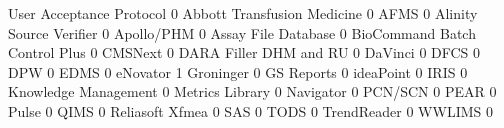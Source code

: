 \documentclass{article}
\begin{document}
\begin{Schunk}
\begin{Soutput}
                                User Acceptance Protocol
                                                       0
  Abbott Transfusion Medicine                          0
  AFMS                                                 0
  Alinity Source Verifier                              0
  Apollo/PHM                                           0
  Assay File Database                                  0
  BioCommand Batch Control Plus                        0
  CMSNext                                              0
  DARA Filler DHM and RU                               0
  DaVinci                                              0
  DFCS                                                 0
  DPW                                                  0
  EDMS                                                 0
  eNovator                                             1
  Groninger                                            0
  GS Reports                                           0
  ideaPoint                                            0
  IRIS                                                 0
  Knowledge Management                                 0
  Metrics Library                                      0
  Navigator                                            0
  PCN/SCN                                              0
  PEAR                                                 0
  Pulse                                                0
  QIMS                                                 0
  Reliasoft Xfmea                                      0
  SAS                                                  0
  TODS                                                 0
  TrendReader                                          0
  WWLIMS                                               0
                               

\end{Soutput}
\end{Schunk}
\end{document}
